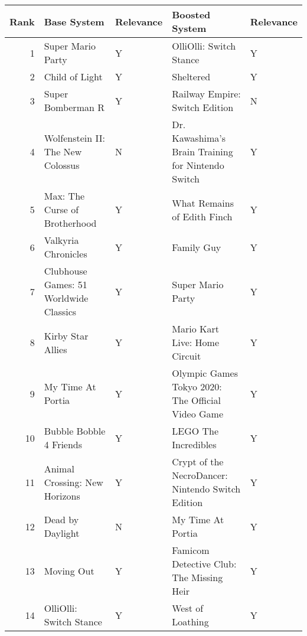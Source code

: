 \begin{tabular}{rllll}
\toprule
 Rank &                                       Base System & Relevance &                                     Boosted System & Relevance \\
\midrule
    1 &                                 Super Mario Party &         Y &                            OlliOlli: Switch Stance &         Y \\
    2 &                                    Child of Light &         Y &                                          Sheltered &         Y \\
    3 &                                 Super Bomberman R &         Y &                     Railway Empire: Switch Edition &         N \\
    4 &                  Wolfenstein II: The New Colossus &         N & Dr. Kawashima's Brain Training for Nintendo Switch &         Y \\
    5 &                     Max: The Curse of Brotherhood &         Y &                        What Remains of Edith Finch &         Y \\
    6 &                               Valkyria Chronicles &         Y &                                         Family Guy &         Y \\
    7 &            Clubhouse Games: 51 Worldwide Classics &         Y &                                  Super Mario Party &         Y \\
    8 &                                 Kirby Star Allies &         Y &                      Mario Kart Live: Home Circuit &         Y \\
    9 &                                 My Time At Portia &         Y &  Olympic Games Tokyo 2020: The Official Video Game &         Y \\
   10 &                           Bubble Bobble 4 Friends &         Y &                               LEGO The Incredibles &         Y \\
   11 &                     Animal Crossing: New Horizons &         Y &  Crypt of the NecroDancer: Nintendo Switch Edition &         Y \\
   12 &                                  Dead by Daylight &         N &                                  My Time At Portia &         Y \\
   13 &                                        Moving Out &         Y &           Famicom Detective Club: The Missing Heir &         Y \\
   14 &                           OlliOlli: Switch Stance &         Y &                                   West of Loathing &         Y \\

\end{tabular}
